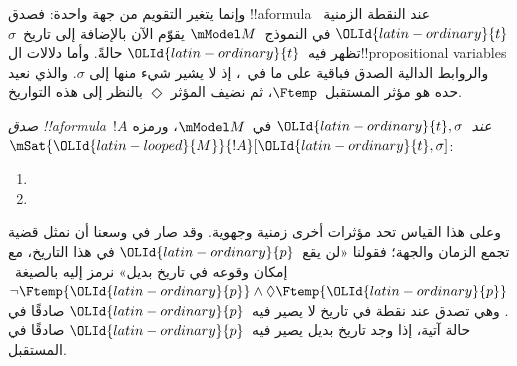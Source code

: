 \documentclass[../../../include/open-logic-section]{subfiles}
\begin{document}
وإنما يتغير التقويم من جهة واحدة: فصدق !!a{formula} عند النقطة الزمنية~${\OLId{latin-ordinary}{t}}$
في النموذج~$\mModel M$ يقوّم الآن بالإضافة إلى تاريخ~$\sigma$ تظهر فيه~${\OLId{latin-ordinary}{t}}$
حالةً. وأما دلالات ال!!{propositional variable}s والروابط الدالية الصدق
فباقية على ما في~، إذ لا يشير شيء منها إلى
$\sigma$. والذي نعيد حده هو مؤثر المستقبل~$\Ftemp$، ثم نضيف المؤثر
$\Diamond$ بالنظر إلى هذه التواريخ.

\begin{defn}
  \emph{صدق !!a{formula}~$!A$ عند~${\OLId{latin-ordinary}{t}},\sigma$} في~$\mModel M$، ورمزه
  $\mSat{{\OLId{latin-looped}{M}}}{!A}[{\OLId{latin-ordinary}{t}},\sigma]$:
  \begin{enumerate}
  \item{} 
  \item{} 
  \end{enumerate}
\end{defn}

وعلى هذا القياس تحد مؤثرات أخرى زمنية وجهوية. وقد صار في وسعنا أن نمثل
قضية تجمع الزمان والجهة؛ فقولنا «لن يقع~${\OLId{latin-ordinary}{p}}$ في هذا التاريخ، مع إمكان وقوعه
في تاريخ بديل» نرمز إليه بالصيغة~$\lnot \Ftemp {\OLId{latin-ordinary}{p}} \land \Diamond \Ftemp {\OLId{latin-ordinary}{p}}$. وهي تصدق عند
نقطة في تاريخ لا يصير فيه~${\OLId{latin-ordinary}{p}}$ صادقًا في حالة آتية، إذا وجد تاريخ بديل
يصير فيه~${\OLId{latin-ordinary}{p}}$ صادقًا في المستقبل.
\end{document}
